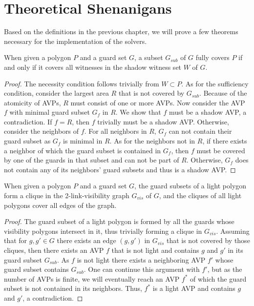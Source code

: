 \chapter{Theoretical Shenanigans}
Based on the definitions in the previous chapter, we will prove a few theorems necessary for the implementation of the solvers.


\begin{theorem}\label{thm:shadow_coverage}
When given a polygon $P$ and a guard set $G$, a subset $G_{sub}$ of $G$ fully covers $P$ if and only if it covers all witnesses in the shadow witness set $W$ of $G$.
\end{theorem}
\begin{proof}
The necessity condition follows trivially from $W\subset P$. As for the sufficiency condition, consider the largest area $R$ that is not covered by $G_{sub}$. Because of the atomicity of AVPs, $R$ must consist of one or more AVPs. Now consider the AVP $f$ with minimal guard subset $G_{f}$ in $R$. We show that $f$ must be a shadow AVP, a contradiction. If $f = R$, then $f$ trivially must be a shadow AVP. Otherwise, consider the neighbors of $f$. For all neighbors in $R$, $G_{f}$ can not contain their guard subset as $G_{f}$ is minimal in $R$. As for the neighbors not in $R$, if there exists a neighbor of which the guard subset is contained in $G_{f}$, then $f$ must be covered by one of the guards in that subset and can not be part of $R$. Otherwise, $G_{f}$ does not contain any of its neighbors' guard subsets and thus is a shadow AVP.
\end{proof}

\begin{theorem}\label{thm:light_covers}
When given a polygon $P$ and a guard set $G$, the guard subsets of a light polygon form a clique in the 2-link-visibility graph $G_{vis}$ of $G$, and the cliques of all light polygons cover all edges of the graph.
\end{theorem}
\begin{proof}
The guard subset of a light polygon is formed by all the guards whose visibility polygons intersect in it, thus trivially forming a clique in $G_{vis}$. Assuming that for $g,g'\in G$ there exists an edge $(g, g')$ in $G_{vis}$ that is not covered by those cliques, then there exists an AVP $f$ that is not light and contains $g$ and $g'$ in its guard subset $G_{sub}$. As $f$ is not light there exists a neighboring AVP $f'$ whose guard subset contains $G_{sub}$. One can continue this argument with $f'$, but as the number of AVPs is finite, we will eventually reach an AVP $f^{*}$ of which the guard subset is not contained in its neighbors. Thus, $f^{*}$ is a light AVP and contains $g$ and $g'$, a contradiction.
\end{proof}

